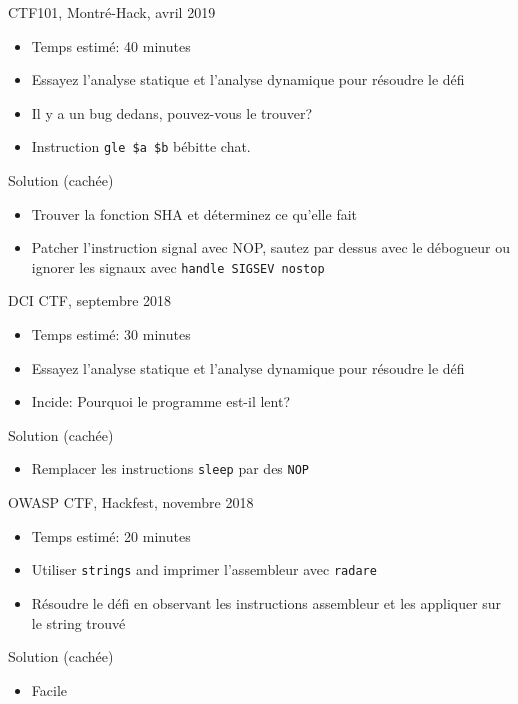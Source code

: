 \documentclass[10pt,xcolor={table,dvipsnames},t]{beamer}
\begin{document}
\begin{frame}{CTF101, Montré-Hack, avril 2019}
    \begin{itemize}
        \item Temps estimé: 40 minutes
        \item Essayez l'analyse statique et l'analyse dynamique pour résoudre le défi
        \item Il y a un bug dedans, pouvez-vous le trouver?
        \item Instruction \texttt{gle \$a \$b} bébitte chat.
    \end{itemize}
    
    \begin{block}{Solution (cachée)}
        \begin{itemize}
            \item Trouver la fonction SHA et déterminez ce qu'elle fait
            \item Patcher l'instruction signal avec NOP, sautez par dessus avec le débogueur ou ignorer les signaux avec \texttt{handle SIGSEV nostop}
        \end{itemize}
    \end{block}
\end{frame}

\begin{frame}{DCI CTF, septembre 2018}
    \begin{itemize}
        \item Temps estimé: 30 minutes
        \item Essayez l'analyse statique et l'analyse dynamique pour résoudre le défi
        \item Incide: Pourquoi le programme est-il lent?
    \end{itemize}
    
    \begin{block}{Solution (cachée)}
        \begin{itemize}
            \item Remplacer les instructions \texttt{sleep} par des \texttt{NOP}
        \end{itemize}
    \end{block}
\end{frame}

\begin{frame}{OWASP CTF, Hackfest, novembre 2018}
    \begin{itemize}
        \item Temps estimé: 20 minutes
        \item Utiliser \texttt{strings} and imprimer l'assembleur avec \texttt{radare}
        \item Résoudre le défi en observant les instructions assembleur et les appliquer sur le string trouvé
    \end{itemize}
    
    \begin{block}{Solution (cachée)}
        \begin{itemize}
            \item Facile
        \end{itemize}
    \end{block}
\end{frame}
\end{document}
